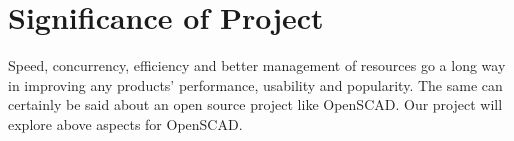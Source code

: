 \section{Significance of Project}
Speed, concurrency, efficiency and better management of resources go a long way in improving any products' performance, usability and popularity. The same can certainly be said about an open source project like OpenSCAD.
Our project will explore above aspects for OpenSCAD.

